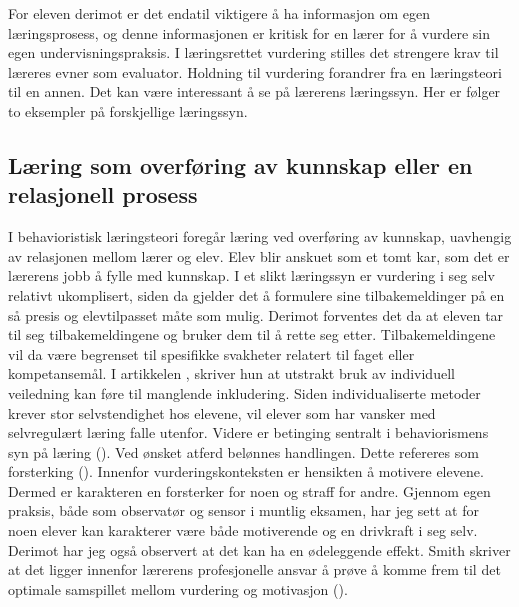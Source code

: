 \documentclass[main.tex]{subfiles}
\begin{document}
For eleven derimot er det endatil viktigere å ha informasjon om egen læringsprosess, og denne informasjonen er kritisk 
for en lærer for å vurdere sin egen undervisningspraksis. I læringsrettet vurdering stilles det strengere krav til 
læreres evner som evaluator. Holdning til vurdering forandrer fra en læringsteori til en annen. Det kan være 
interessant å se på lærerens læringssyn. Her er følger to eksempler på forskjellige læringssyn.

\subsection*{Læring som overføring av kunnskap eller en relasjonell prosess}

I behavioristisk læringsteori foregår læring ved overføring av kunnskap, uavhengig av relasjonen mellom lærer 
og elev. Elev blir anskuet som et tomt kar, som det er lærerens jobb å fylle med kunnskap. 
I et slikt læringssyn er vurdering i seg selv relativt ukomplisert, siden da gjelder det å 
formulere sine tilbakemeldinger på en så presis og elevtilpasset måte som mulig.
Derimot forventes det da at eleven tar til seg tilbakemeldingene og bruker dem til å rette seg etter.
Tilbakemeldingene vil da være begrenset til spesifikke svakheter relatert til faget eller kompetansemål.
I artikkelen , skriver hun at utstrakt bruk av individuell veiledning kan føre
til manglende inkludering. Siden individualiserte metoder krever stor selvstendighet hos elevene, vil
elever som har vansker med selvregulært læring falle utenfor. Videre er betinging sentralt i behaviorismens 
syn på læring (). Ved ønsket atferd belønnes handlingen. Dette refereres som forsterking 
(). Innenfor vurderingskonteksten er hensikten å motivere elevene. Dermed er karakteren en 
forsterker for noen og straff for andre. Gjennom egen praksis, både som observatør og sensor i muntlig eksamen,
har jeg sett at for noen elever kan karakterer være både motiverende og en drivkraft i seg selv. Derimot
har jeg også observert at det kan ha en ødeleggende effekt. Smith skriver at det ligger innenfor
lærerens profesjonelle ansvar å prøve å komme frem til det optimale samspillet mellom vurdering og 
motivasjon ().
\end{document}
